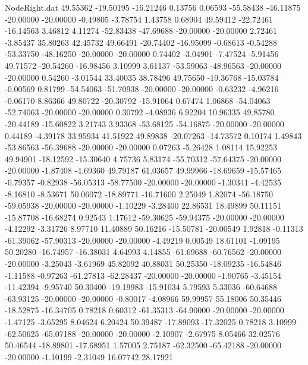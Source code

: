 \begin{filecontents}{NodeRight.dat}
  49.55362  -19.50195  -16.21246     0.13756    0.06593  -55.58438  -46.11875  -20.00000  -20.00000   -0.49805   -3.78754    1.43758    0.68904
  49.59412  -22.72461  -16.14563     3.46812    4.11274  -52.83438  -47.69688  -20.00000  -20.00000    2.72461   -3.85437   35.80263   42.45732
  49.66491  -20.74402  -16.95099    -0.68613   -0.54288  -53.33750  -48.16250  -20.00000  -20.00000    0.74402   -3.04901   -7.47524   -5.91456
  49.71572  -20.54260  -16.98456     3.10999    3.61137  -53.59063  -48.96563  -20.00000  -20.00000    0.54260   -3.01544   33.40035   38.78496
  49.75650  -19.36768  -15.03784    -0.00569    0.81799  -54.54063  -51.70938  -20.00000  -20.00000   -0.63232   -4.96216   -0.06170    8.86366
  49.80722  -20.30792  -15.91064     0.67474    1.06868  -54.04063  -52.74063  -20.00000  -20.00000    0.30792   -4.08936    6.92204   10.96335
  49.85780  -20.44189  -15.60822     3.21743    3.93368  -53.68125  -54.16875  -20.00000  -20.00000    0.44189   -4.39178   33.95934   41.51922
  49.89838  -20.07263  -14.73572     0.10174    1.49843  -53.86563  -56.39688  -20.00000  -20.00000    0.07263   -5.26428    1.08114   15.92253
  49.94901  -18.12592  -15.30640     4.75736    5.83174  -55.70312  -57.64375  -20.00000  -20.00000   -1.87408   -4.69360   49.79187   61.03657
  49.99966  -18.69659  -15.57465    -0.79357   -0.82938  -56.05313  -58.77500  -20.00000  -20.00000   -1.30341   -4.42535   -8.16810   -8.53671
  50.06072  -18.89771  -16.71600     2.25049    1.82074  -56.18750  -59.05938  -20.00000  -20.00000   -1.10229   -3.28400   22.86531   18.49899
  50.11151  -15.87708  -16.68274     0.92543    1.17612  -59.30625  -59.94375  -20.00000  -20.00000   -4.12292   -3.31726    8.97710   11.40889
  50.16216  -15.50781  -20.00549     1.92818   -0.11313  -61.39062  -57.90313  -20.00000  -20.00000   -4.49219    0.00549   18.61101   -1.09195
  50.20280  -16.74957  -16.38031     4.64993    4.14855  -61.69688  -60.76562  -20.00000  -20.00000   -3.25043   -3.61969   45.82092   40.88031
  50.25350  -18.09235  -16.54846    -1.11588   -0.97263  -61.27813  -62.28437  -20.00000  -20.00000   -1.90765   -3.45154  -11.42394   -9.95740
  50.30400  -19.19983  -15.91034     5.79593    5.33036  -60.64688  -63.93125  -20.00000  -20.00000   -0.80017   -4.08966   59.99957   55.18006
  50.35446  -18.52875  -16.34705     0.78218    0.60312  -61.35313  -64.90000  -20.00000  -20.00000   -1.47125   -3.65295    8.04624    6.20424
  50.39487  -17.89093  -17.32025     0.78218    3.10999  -62.50625  -65.07188  -20.00000  -20.00000   -2.10907   -2.67975    8.05466   32.02576
  50.46544  -18.89801  -17.68951     1.57005    2.75187  -62.32500  -65.42188  -20.00000  -20.00000   -1.10199   -2.31049   16.07742   28.17921

\end{filecontents}

